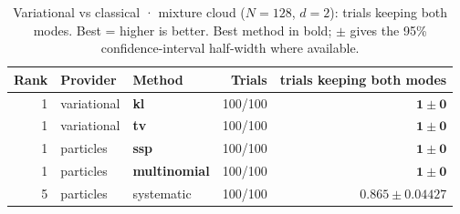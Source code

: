 \begin{table}[!htbp]
\centering
\small
\caption{Variational vs classical · mixture cloud ($N=128$, $d=2$): trials keeping both modes. Best = higher is better. Best method in bold; $\pm$ gives the 95\% confidence-interval half-width where available.}
\label{tab:variational-vs-classical-mixture-cloud-mode-coverage}
\begin{tabular}{rllrr}
\toprule
Rank & Provider & Method & Trials & trials keeping both modes \\
\midrule
1 & variational & \textbf{kl} & 100/100 & $\mathbf{1 \pm 0}$ \\
1 & variational & \textbf{tv} & 100/100 & $\mathbf{1 \pm 0}$ \\
1 & particles & \textbf{ssp} & 100/100 & $\mathbf{1 \pm 0}$ \\
1 & particles & \textbf{multinomial} & 100/100 & $\mathbf{1 \pm 0}$ \\
5 & particles & systematic & 100/100 & $0.865 \pm 0.04427$ \\
\bottomrule
\end{tabular}
\end{table}
